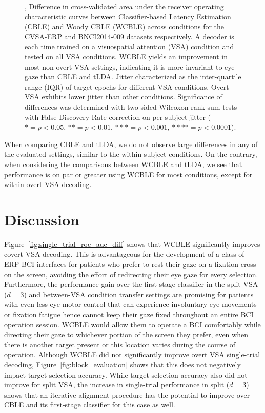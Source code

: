 \begin{figure}
	\caption{
		,
    Difference in cross-validated area under the receiver
		operating characteristic curves between Classifier-based Latency Estimation
    (CBLE) and Woody CBLE (WCBLE) across conditions for the CVSA-ERP and
    BNCI2014-009 datasets respectively.
    A decoder is each	time trained on a visuospatial attention (VSA) condition
    and tested on all VSA conditions.
    WCBLE yields an improvement in most
		non-overt VSA settings, indicating it is more invariant to eye gaze than
    CBLE and tLDA.
		 Jitter characterized as the inter-quartile range (IQR)
		of target epochs for different VSA conditions. Overt VSA exhibits lower
    jitter than other conditions.
    Significance of differences
    was determined with two-sided Wilcoxon rank-sum tests with False Discovery
    Rate correction on per-subject jitter ($*= p<0.05$, $**=p<0.01$,
    $***=p<0.001$, $****=p<0.0001$).
	}
\end{figure}
When comparing CBLE and tLDA, we do not observe large differences in any of the
evaluated settings, similar to the within-subject conditions.
On the contrary, when considering the comparisons between WCBLE and tLDA, we
see that performance is on par or greater using WCBLE for most conditions,
except for within-overt VSA decoding.

\section{Discussion}

Figure~\ref{fig:single_trial_roc_auc_diff} shows that WCBLE significantly improves
covert VSA decoding.
This is advantageous for the development of a class of ERP-BCI interfaces for
patients who prefer to rest their gaze on a fixation cross on the screen,
avoiding the effort of redirecting their eye gaze for every selection.
Furthermore, the performance gain over the first-stage classifier in the split
VSA ($d=3$) and between-VSA condition transfer settings are promising for
patients with even less eye motor control that can experience involuntary eye
movements or fixation fatigue hence cannot keep their gaze fixed throughout an
entire BCI operation session.
WCBLE would allow them to operate a BCI comfortably while directing
their gaze to whichever portion of the screen they prefer, even when there is
another target present or this location varies during the
course of operation.
Although WCBLE did not significantly improve overt VSA single-trial decoding,
Figure~\ref{fig:block_evaluation} shows that this does not negatively impact target
selection accuracy.
While target selection accuracy also did not improve for split VSA, the
increase in single-trial performance in split ($d=3$) shows that an iterative
alignment procedure has the potential to improve over CBLE and its first-stage
classifier for this case as well.

